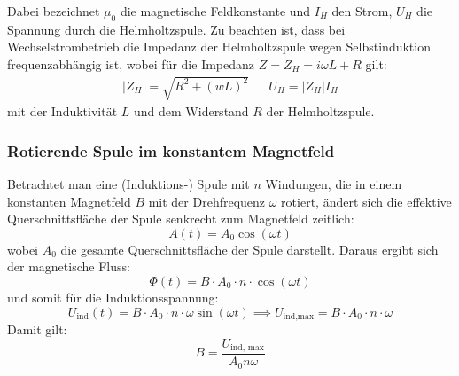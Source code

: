 Dabei bezeichnet \( \mu_0 \) die magnetische Feldkonstante und \( I_H \) den Strom, \(U_H\) die Spannung durch die Helmholtzspule. Zu beachten ist, dass bei Wechselstrombetrieb die Impedanz der Helmholtzspule wegen Selbstinduktion frequenzabhängig ist, wobei für die Impedanz \( Z =Z_H = i \omega L + R\) gilt:
\begin{align} \label{eq:impedance_realpart}
    |Z_H|=\sqrt{R^2+(wL)^2} && U_H=|Z_H|I_H
\end{align}
mit der Induktivität \( L \) und dem Widerstand \(R\) der Helmholtzspule. 

\subsubsection{Rotierende Spule im konstantem Magnetfeld}
\label{sec:rotating}
Betrachtet man eine (Induktions-) Spule mit \( n \) Windungen, die in einem konstanten Magnetfeld \( B \) mit der Drehfrequenz \( \omega \) rotiert, ändert sich die effektive Querschnittsfläche der Spule senkrecht zum Magnetfeld zeitlich:
\begin{equation} \label{eq:rotating_area}
    A(t) = A_0 \cos(\omega t)
\end{equation}
wobei \( A_0 \) die gesamte Querschnittsfläche der Spule darstellt. Daraus ergibt sich der magnetische Fluss:
\begin{equation} \label{eq:flux_rotating}
    \Phi(t) = B \cdot A_0 \cdot n \cdot \cos(\omega t)
\end{equation}
und somit für die Induktionsspannung:
\begin{equation} \label{eq:voltage_rotating}
    U_{\text{ind}}(t) = B \cdot A_0 \cdot n \cdot \omega \sin(\omega t)\implies U_{\text{ind,max}} = B \cdot A_0 \cdot n \cdot \omega 
\end{equation}
Damit gilt:
\begin{equation} \label{eq:B}
    B=\frac{U_\text{ind, max}}{A_0 n \omega}
\end{equation}

